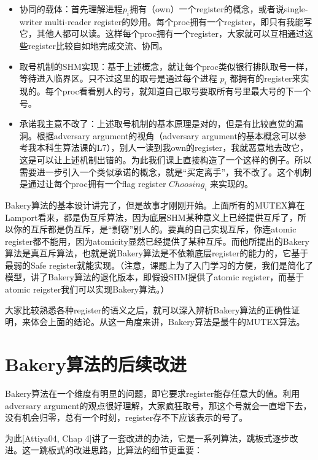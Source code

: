 \documentclass[UTF8]{ctexrep}
\begin{document}
\begin{itemize}
    \item 协同的载体：首先理解进程$p_i$拥有（own）一个register的概念，或者说single-writer multi-reader register的妙用。每个proc拥有一个register，即只有我能写它，其他人都可以读。这样每个proc拥有一个register，大家就可以互相通过这些register比较自如地完成交流、协同。
    
    \item 取号机制的SHM实现：基于上述概念，就让每个proc类似银行排队取号一样，等待进入临界区。只不过这里的取号是通过每个进程 $p_i$ 都拥有的register来实现的。每个proc看看别人的号，就知道自己取号要取所有号里最大号的下一个号。
    
    \item 承诺我主意不改了：上述取号机制的基本原理是对的，但是有比较直觉的漏洞。根据adversary argument的视角（adversary argument的基本概念可以参考我本科生算法课的L7），别人一读到我own的register，我就恶意地去改它，这是可以让上述机制出错的。为此我们课上直接构造了一个这样的例子。所以需要进一步引入一个类似承诺的概念，就是“买定离手”，我不改了。这个机制是通过让每个proc拥有一个flag register $Choosing_i$ 来实现的。
    
\end{itemize}

Bakery算法的基本设计讲完了，但是故事才刚刚开始。上面所有的MUTEX算在Lamport看来，都是伪互斥算法，因为底层SHM某种意义上已经提供互斥了，所以你的互斥都是伪互斥，是“剽窃”别人的。要真的自己实现互斥，你连atomic register都不能用，因为atomicity显然已经提供了某种互斥。而他所提出的Bakery算法是真互斥算法，也就是说Bakery算法是不依赖底层register的能力的，它基于最弱的Safe register就能实现。（注意，课题上为了入门学习的方便，我们是简化了模型，讲了Bakery算法的退化版本，即假设SHM提供了atomic register，而基于atomic reigster我们可以实现Bakery算法。）

大家比较熟悉各种register的语义之后，就可以深入辨析Bakery算法的正确性证明，来体会上面的结论。从这一角度来讲，Bakery算法是最牛的MUTEX算法。

\section{Bakery算法的后续改进}

Bakery算法在一个维度有明显的问题，即它要求register能存任意大的值。利用adversary argument的观点很好理解，大家疯狂取号，那这个号就会一直增下去，没有机会归零，总有一个时刻，register存不下应该表示的号了。

为此[Attiya04, Chap 4]讲了一套改进的办法，它是一系列算法，跳板式逐步改进。这一跳板式的改进思路，比算法的细节更重要：
\end{document}
